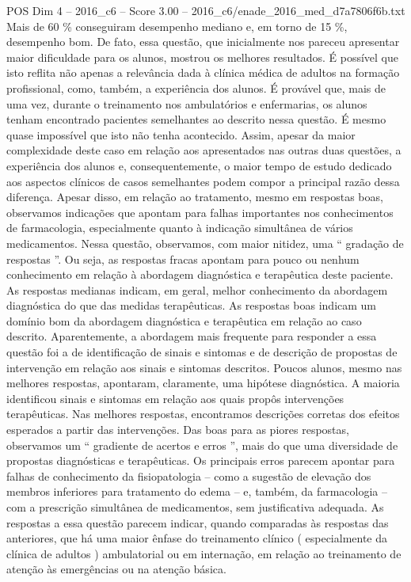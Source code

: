 \begin{textsample}{POS Dim 4 – 2016\_c6 – Score 3.00 – 2016\_c6/enade\_2016\_med\_d7a7806f6b.txt}
Mais de 60 \% conseguiram desempenho mediano e, em torno de 15 \%, desempenho bom.
De fato, essa questão, que inicialmente nos pareceu apresentar maior dificuldade para os alunos, mostrou os melhores resultados.
É possível que isto reflita não apenas a relevância dada à clínica médica de adultos na formação profissional, como, também, a experiência dos alunos.
É provável que, mais de uma vez, durante o treinamento nos ambulatórios e enfermarias, os alunos tenham encontrado pacientes semelhantes ao descrito nessa questão.
É mesmo quase impossível que isto não tenha acontecido.
Assim, apesar da maior complexidade deste caso em relação aos apresentados nas outras duas questões, a experiência dos alunos e, consequentemente, o maior tempo de estudo dedicado aos aspectos clínicos de casos semelhantes podem compor a principal razão dessa diferença.
Apesar disso, em relação ao tratamento, mesmo em respostas boas, observamos indicações que apontam para falhas importantes nos conhecimentos de farmacologia, especialmente quanto à indicação simultânea de vários medicamentos.
Nessa questão, observamos, com maior nitidez, uma “ gradação de respostas ”.
Ou seja, as respostas fracas apontam para pouco ou nenhum conhecimento em relação à abordagem diagnóstica e terapêutica deste paciente.
As respostas medianas indicam, em geral, melhor conhecimento da abordagem diagnóstica do que das medidas terapêuticas.
As respostas boas indicam um domínio bom da abordagem diagnóstica e terapêutica em relação ao caso descrito.
Aparentemente, a abordagem mais frequente para responder a essa questão foi a de identificação de sinais e sintomas e de descrição de propostas de intervenção em relação aos sinais e sintomas descritos.
Poucos alunos, mesmo nas melhores respostas, apontaram, claramente, uma hipótese diagnóstica.
A maioria identificou sinais e sintomas em relação aos quais propôs intervenções terapêuticas.
Nas melhores respostas, encontramos descrições corretas dos efeitos esperados a partir das intervenções.
Das boas para as piores respostas, observamos um “ gradiente de acertos e erros ”, mais do que uma diversidade de propostas diagnósticas e terapêuticas.
Os principais erros parecem apontar para falhas de conhecimento da fisiopatologia – como a sugestão de elevação dos membros inferiores para tratamento do edema – e, também, da farmacologia – com a prescrição simultânea de medicamentos, sem justificativa adequada.
As respostas a essa questão parecem indicar, quando comparadas às respostas das anteriores, que há uma maior ênfase do treinamento clínico ( especialmente da clínica de adultos ) ambulatorial ou em internação, em relação ao treinamento de atenção às emergências ou na atenção básica.

\end{textsample}
